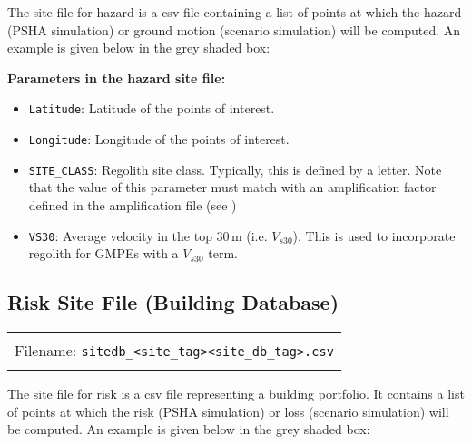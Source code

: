 The site file for hazard is a csv file containing a list of points at which the hazard (PSHA simulation)
 or ground motion (scenario simulation) will be computed. An example is
 given below in the grey shaded box:


\textbf{Parameters in the hazard site file:}
\begin{itemize}
\item \texttt{Latitude}: Latitude of the points of interest.
\item \texttt{Longitude}: Longitude of the points of interest.
\item \texttt{SITE\_CLASS}: Regolith site class. Typically, this is defined
by a letter. Note that the value of this parameter must match with
an amplification factor defined in the amplification file (see
)
\item \texttt{VS30}: Average velocity in the top 30\,m (i.e. $V_{s30}$). This is used
to incorporate regolith for GMPEs with a $V_{s30}$ term.
\end{itemize}

\subsection{Risk Site File (Building Database)}
\label{sec:grids-bdatabase}

\begin{center}
\begin{tabular}{|c|}
\hline
\\
Filename: \texttt{sitedb\_<site\_tag><site\_db\_tag>.csv} \\
\\
\hline
\end{tabular}
\end{center}

The site file for risk is a csv file representing a building
portfolio. It contains a list of points at which the risk (PSHA simulation)
 or loss (scenario simulation) will be computed. An example is
 given below in the grey shaded box:



